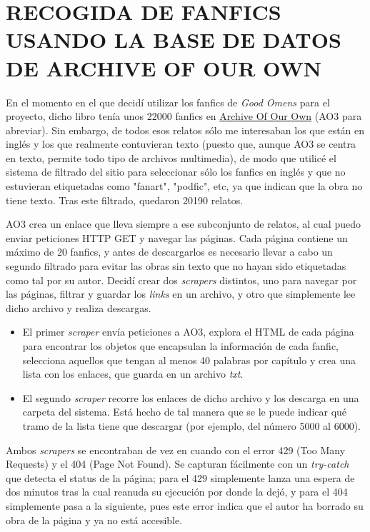 \documentclass{pre-tfg}
\begin{document}
\section{RECOGIDA DE FANFICS USANDO LA BASE DE DATOS DE ARCHIVE OF OUR OWN}

En el momento en el que decidí utilizar los fanfics de \textit{Good Omens} para el proyecto, dicho libro tenía unos 22000 fanfics en \href{archiveofourown.org}{Archive Of Our Own} (AO3 para abreviar). Sin embargo, de todos esos relatos sólo me interesaban los que están en inglés y los que realmente contuvieran texto (puesto que, aunque AO3 se centra en texto, permite todo tipo de archivos multimedia), de modo que utilicé el sistema de filtrado del sitio para seleccionar sólo los fanfics en inglés y que no estuvieran etiquetadas como "fanart", "podfic", etc, ya que indican que la obra no tiene texto. Tras este filtrado, quedaron 20190 relatos.

AO3 crea un enlace que lleva siempre a ese subconjunto de relatos, al cual puedo enviar peticiones HTTP GET y navegar las páginas. Cada página contiene un máximo de 20 fanfics, y antes de descargarlos es necesario llevar a cabo un segundo filtrado para evitar las obras sin texto que no hayan sido etiquetadas como tal por su autor. Decidí crear dos \textit{scrapers} distintos, uno para navegar por las páginas, filtrar y guardar los \textit{links} en un archivo, y otro que simplemente lee dicho archivo y realiza descargas.

\begin{itemize}
	\item El primer \textit{scraper} envía peticiones a AO3, explora el HTML de cada página para encontrar los objetos que encapsulan la información de cada fanfic, selecciona aquellos que tengan al menos 40 palabras por capítulo y crea una lista con los enlaces, que guarda en un archivo \textit{txt}.
	\item El segundo \textit{scraper} recorre los enlaces de dicho archivo y los descarga en una carpeta del sistema. Está hecho de tal manera que se le puede indicar qué tramo de la lista tiene que descargar (por ejemplo, del número 5000 al 6000).
	
\end{itemize}

Ambos \textit{scrapers} se encontraban de vez en cuando con el error 429 (Too Many Requests) y el 404 (Page Not Found). Se capturan fácilmente con un \textit{try-catch} que detecta el status de la página; para el 429 simplemente lanza una espera de dos minutos tras la cual reanuda su ejecución por donde la dejó, y para el 404 simplemente pasa a la siguiente, pues este error indica que el autor ha borrado su obra de la página y ya no está accesible.
 
\end{document}
